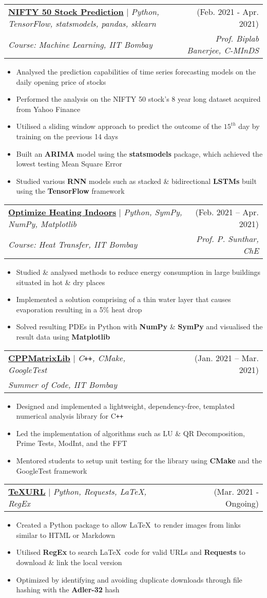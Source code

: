 \documentclass[a4paper,11pt]{article}
\makeatletter
\def\Plus{\texttt{+}}
\newcommand{\resumeItem}[1]{
  \item\small{
    {#1 \vspace{-2pt}}
  }
}
\newcommand{\resumeProjectHeading}[4]{
    \item
    \begin{tabular*}{\textwidth}{l@{\extracolsep{\fill}}r}
      \small#1 & #2 \\
      \textit{\small#3} & \textit{\small #4}\\
    \end{tabular*}\vspace{-7pt}
}
\newcommand{\resumeProjectHeadingAlt}[2]{
    \item
    \begin{tabular*}{\textwidth}{l@{\extracolsep{\fill}}r}
      \small#1 & #2 \\
    \end{tabular*}\vspace{-7pt}
}
\newcommand{\resumeItemListStart}{\begin{itemize}}
\newcommand{\resumeItemListEnd}{\end{itemize}\vspace{-5pt}}
\makeatother
\begin{document}
  \resumeProjectHeading
  {\href{https://github.com/relaxxpls/StockPrediction}{\textbf{NIFTY 50 Stock Prediction}} $|$ \emph{Python, TensorFlow, statsmodels, pandas, sklearn}}{(Feb. 2021 - Apr. 2021)}
  {Course: Machine Learning, IIT Bombay}{Prof. Biplab Banerjee, C-MInDS}
  \resumeItemListStart
    \resumeItem{Analysed the prediction capabilities of time series forecasting models on the daily opening price of stocks}
    \resumeItem{Performed the analysis on the NIFTY 50 stock's 8 year long dataset acquired from Yahoo Finance}
    \resumeItem{Utilised a sliding window approach to predict the outcome of the $15^{th}$ day by training on the previous 14 days}
    \resumeItem{Built an \textbf{ARIMA} model using the \textbf{statsmodels} package, which achieved the lowest testing Mean Square Error}
    \resumeItem{Studied various \textbf{RNN} models such as stacked \& bidirectional \textbf{LSTMs} built using the \textbf{TensorFlow} framework}
  \resumeItemListEnd

  \resumeProjectHeading
  {\href{https://github.com/relaxxpls/Optimize-Heating-Indoors}{\textbf{Optimize Heating Indoors}} $|$ \emph{Python, SymPy, NumPy, Matplotlib}}{(Feb. 2021 -- Apr. 2021)}
  {Course: Heat Transfer, IIT Bombay}{Prof. P. Sunthar, ChE}
  \resumeItemListStart
    \resumeItem{Studied \& analysed methods to reduce energy consumption in large buildings situated in hot \& dry places}
    \resumeItem{Implemented a solution comprising of a thin water layer that causes evaporation resulting in a 5\% heat drop}
    \resumeItem{Solved resulting PDEs in Python with \textbf{NumPy} \& \textbf{SymPy} and visualised the result data using \textbf{Matplotlib}}
  \resumeItemListEnd

  \resumeProjectHeading
  {\href{https://github.com/relaxxpls/Optimize-Heating-Indoors}{\textbf{CPPMatrixLib}} $|$ \emph{C\Plus\Plus, CMake, GoogleTest}}{(Jan. 2021 -- Mar. 2021)}
  {Summer of Code, IIT Bombay}{}
  \resumeItemListStart
    \resumeItem{Designed and implemented a lightweight, dependency-free, templated numerical analysis library for C\Plus\Plus}
    \resumeItem{Led the implementation of algorithms such as LU \& QR Decomposition, Prime Tests, ModInt, and the FFT}
    \resumeItem{Mentored students to setup unit testing for the library using \textbf{CMake} and the GoogleTest framework}
  \resumeItemListEnd

\vspace{1cm}
  \resumeProjectHeadingAlt
  {\href{https://github.com/relaxxpls/TeXURL}{\textbf{TeXURL}} $|$ \emph{Python, Requests, \LaTeX, RegEx}}{(Mar. 2021 - Ongoing)}
  \resumeItemListStart
    \resumeItem{Created a Python package to allow \LaTeX\ to render images from links similar to HTML or Markdown}
    \resumeItem{Utilised \textbf{RegEx} to search \LaTeX\ code for valid URLs and \textbf{Requests} to download \& link the local version}
    \resumeItem{Optimized by identifying and avoiding duplicate downloads through file hashing with the \textbf{Adler-32} hash}
  \resumeItemListEnd
\end{document}
